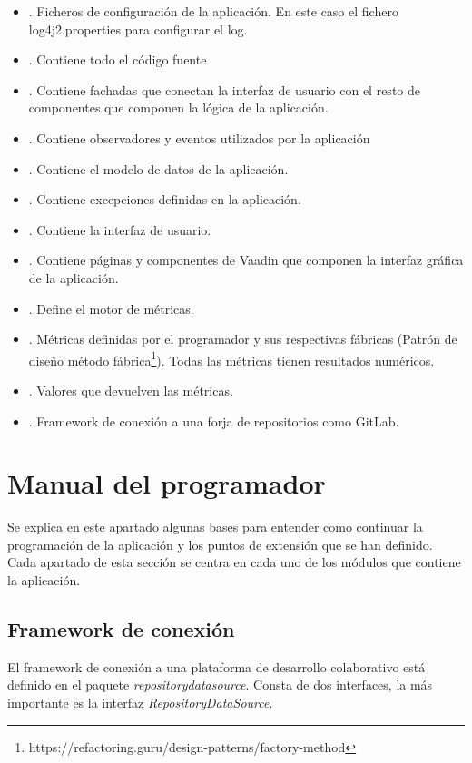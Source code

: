 \begin{itemize}
	\item {}. Ficheros de configuración de la aplicación. En este caso el fichero log4j2.properties para configurar el log.
	\item {}. Contiene todo el código fuente
	\item {}. Contiene fachadas que conectan la interfaz de usuario con el resto de componentes que componen la lógica de la aplicación.
	\item {}. Contiene observadores y eventos utilizados por la aplicación
	\item {}. Contiene el modelo de datos de la aplicación.
	\item {}. Contiene excepciones definidas en la aplicación.
	\item {}. Contiene la interfaz de usuario.
	\item {}. Contiene páginas y componentes de Vaadin que componen la interfaz gráfica de la aplicación.
	\item {}. Define el motor de métricas.
	\item {}. Métricas definidas por el programador y sus respectivas fábricas (Patrón de diseño método fábrica\footnote{https://refactoring.guru/design-patterns/factory-method}). Todas las métricas tienen resultados numéricos.
	\item {}. Valores que devuelven las métricas.
	\item {}. Framework de conexión a una forja de repositorios como GitLab.
\end{itemize}

\section{Manual del programador}
Se explica en este apartado algunas bases para entender como continuar la programación de la aplicación y los puntos de extensión que se han definido.
Cada apartado de esta sección se centra en cada uno de los módulos que contiene la aplicación.

\subsection{Framework de conexión}
El framework de conexión a una plataforma de desarrollo colaborativo está definido en el paquete \textit{repositorydatasource}. Consta de dos interfaces, la más importante es la interfaz \textit{RepositoryDataSource}.

